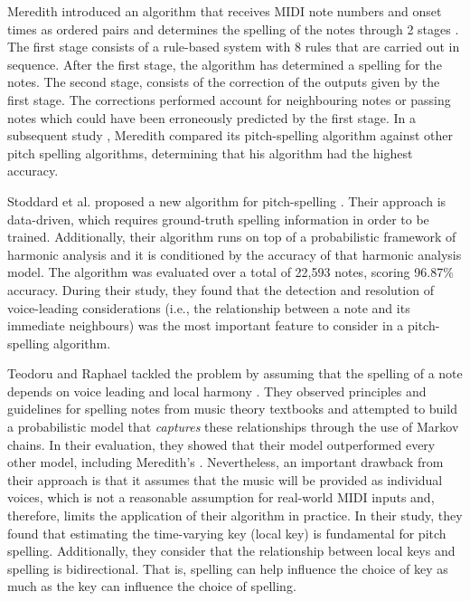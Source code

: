 Meredith introduced an algorithm that receives MIDI note
numbers and onset times as ordered pairs and determines the
spelling of the notes through 2 stages
\parencite{meredith2003pitch}. The first stage consists of a
rule-based system with 8 rules that are carried out in
sequence. After the first stage, the algorithm has
determined a spelling for the notes. The second stage,
consists of the correction of the outputs given by the first
stage. The corrections performed account for neighbouring
notes or passing notes which could have been erroneously
predicted by the first stage. In a subsequent study
\parencite{meredith2005comparing}, Meredith compared its
pitch-spelling algorithm against other pitch spelling
algorithms, determining that his algorithm had the highest
accuracy.



Stoddard et al. proposed a new algorithm for pitch-spelling
\parencite{stoddard2004welltempered}. Their approach is
data-driven, which requires ground-truth spelling
information in order to be trained. Additionally, their
algorithm runs on top of a probabilistic framework of
harmonic analysis \parencite{raphael2003harmonic} and it is
conditioned by the accuracy of that harmonic analysis model.
The algorithm was evaluated over a total of 22,593 notes,
scoring 96.87\% accuracy. During their study, they found
that the detection and resolution of voice-leading
considerations (i.e., the relationship between a note and
its immediate neighbours) was the most important feature to
consider in a pitch-spelling algorithm.

Teodoru and Raphael tackled the problem by assuming that the
spelling of a note depends on voice leading and local
harmony \parencite{teodoru2007pitch}. They observed
principles and guidelines for spelling notes from music
theory textbooks \parencite{aldwell2017harmony,
rimskykorsakov2005practical} and attempted to build a
probabilistic model that \emph{captures} these relationships
through the use of Markov chains. In their evaluation, they
showed that their model outperformed every other model,
including Meredith's \parencite{meredith_ps13_2006}.
Nevertheless, an important drawback from their approach is
that it assumes that the music will be provided as
individual voices, which is not a reasonable assumption for
real-world MIDI inputs and, therefore, limits the
application of their algorithm in practice. In their study,
they found that estimating the time-varying key (local key)
is fundamental for pitch spelling. Additionally, they
consider that the relationship between local keys and
spelling is bidirectional. That is, spelling can help
influence the choice of key as much as the key can influence
the choice of spelling.
